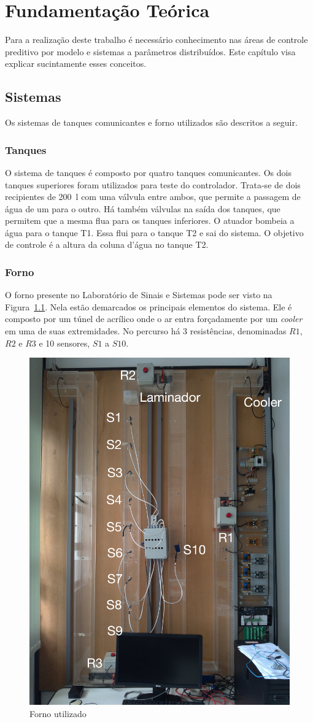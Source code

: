 
\chapter{Fundamentação Teórica}%
\label{chp:foundations}

Para a realização deste trabalho é necessário conhecimento nas áreas de controle
preditivo por modelo e sistemas a parâmetros distribuídos. Este capítulo visa
explicar sucintamente esses conceitos.

\section{Sistemas}%
\label{sec:systems}

Os sistemas de tanques comunicantes e forno utilizados são descritos a seguir.

\subsection{Tanques}%
\label{subsec:tanks}

O sistema de tanques é composto por quatro tanques comunicantes. Os dois tanques
superiores foram utilizados para teste do controlador. Trata-se de dois
recipientes de \SI{200}{\litre} com uma válvula entre ambos, que permite a
passagem de água de um para o outro. Há também válvulas na saída dos tanques,
que permitem que a mesma flua para os tanques inferiores. O atuador bombeia a
água para o tanque T1. Essa flui para o tanque T2 e sai do sistema. O objetivo
de controle é a altura da coluna d'água no tanque T2.

\subsection{Forno}%
\label{subsec:oven}

O forno presente no Laboratório de Sinais e Sistemas pode ser visto na
Figura~\ref{fig:forno}. Nela estão demarcados os principais elementos do
sistema. Ele é composto por um túnel de acrílico onde o ar entra forçadamente
por um \textit{cooler} em uma de suas extremidades. No percurso há 3
resistências, denominadas \(R1\), \(R2\) e \(R3\) e 10 sensores, \(S1\) a
\(S10\).

\begin{figure}[ht!]
    \centering
    \captionsetup{justification=centering}
    \includegraphics[height=0.5\linewidth]{imgs/forno}
    \caption{Forno utilizado}%
    \label{fig:forno}
\end{figure}

